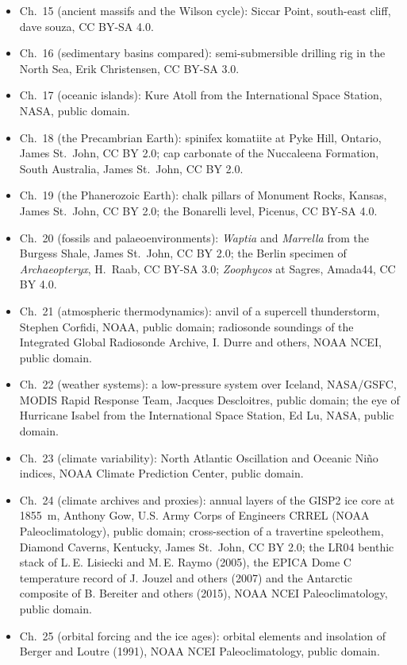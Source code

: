 \begin{itemize}
  \item Ch.~15 (ancient massifs and the Wilson cycle): Siccar Point, south-east cliff, dave souza, CC BY-SA 4.0.
  \item Ch.~16 (sedimentary basins compared): semi-submersible drilling rig in the North Sea, Erik Christensen, CC BY-SA 3.0.
  \item Ch.~17 (oceanic islands): Kure Atoll from the International Space Station, NASA, public domain.
  \item Ch.~18 (the Precambrian Earth): spinifex komatiite at Pyke Hill, Ontario, James St.~John, CC BY 2.0; cap carbonate of the Nuccaleena Formation, South Australia, James St.~John, CC BY 2.0.
  \item Ch.~19 (the Phanerozoic Earth): chalk pillars of Monument Rocks, Kansas, James St.~John, CC BY 2.0; the Bonarelli level, Picenus, CC BY-SA 4.0.
  \item Ch.~20 (fossils and palaeoenvironments): \emph{Waptia} and \emph{Marrella} from the Burgess Shale, James St.~John, CC BY 2.0; the Berlin specimen of \emph{Archaeopteryx}, H.~Raab, CC BY-SA 3.0; \emph{Zoophycos} at Sagres, Amada44, CC BY 4.0.
  \item Ch.~21 (atmospheric thermodynamics): anvil of a supercell thunderstorm, Stephen Corfidi, NOAA, public domain; radiosonde soundings of the Integrated Global Radiosonde Archive, I. Durre and others, NOAA NCEI, public domain.
  \item Ch.~22 (weather systems): a low-pressure system over Iceland, NASA/GSFC, MODIS Rapid Response Team, Jacques Descloitres, public domain; the eye of Hurricane Isabel from the International Space Station, Ed Lu, NASA, public domain.
  \item Ch.~23 (climate variability): North Atlantic Oscillation and Oceanic Niño indices, NOAA Climate Prediction Center, public domain.
  \item Ch.~24 (climate archives and proxies): annual layers of the GISP2 ice core at 1855~m, Anthony Gow, U.S. Army Corps of Engineers CRREL (NOAA Paleoclimatology), public domain; cross-section of a travertine speleothem, Diamond Caverns, Kentucky, James St.~John, CC BY 2.0; the LR04 benthic stack of L.\,E. Lisiecki and M.\,E. Raymo (2005), the EPICA Dome C temperature record of J. Jouzel and others (2007) and the Antarctic  composite of B. Bereiter and others (2015), NOAA NCEI Paleoclimatology, public domain.
  \item Ch.~25 (orbital forcing and the ice ages): orbital elements and insolation of Berger and Loutre (1991), NOAA NCEI Paleoclimatology, public domain.

\end{itemize}
